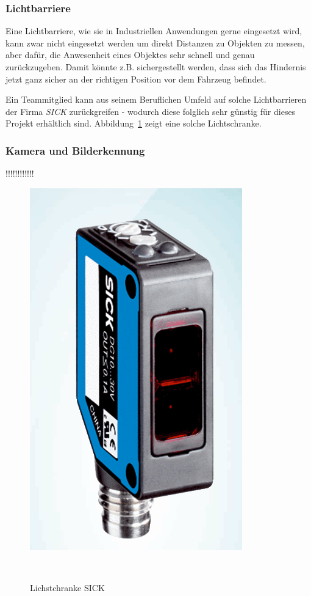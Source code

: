 \documentclass[main.tex]{subfiles} %
\begin{document}
\subsubsection*{Lichtbarriere}
Eine Lichtbarriere, wie sie in Industriellen Anwendungen gerne eingesetzt wird,
kann zwar nicht eingesetzt werden um direkt Distanzen zu Objekten zu messen, aber dafür,
die Anwesenheit eines Objektes sehr schnell und genau zurückzugeben. Damit könnte z.B. sichergestellt werden,
dass sich das Hindernis jetzt ganz sicher an der richtigen Position vor dem Fahrzeug befindet.

Ein Teammitglied kann aus seinem Beruflichen Umfeld auf solche Lichtbarrieren
der Firma \textit{SICK} zurückgreifen - wodurch diese folglich sehr günstig für
dieses Projekt erhältlich sind. Abbildung~\ref{fig:SICK_Sensor} zeigt eine
solche Lichtschranke.

\subsubsection*{Kamera und Bilderkennung}

!!!!!!!!!!!! %

\begin{figure}[h!]
    \centering
    \includegraphics[width=0.75\linewidth]{./fig_Hinderniserkennung/SICK_Lichtschranke.png}
    \caption{Lichstchranke SICK}~\label{fig:SICK_Sensor}
\end{figure}
\end{document}
